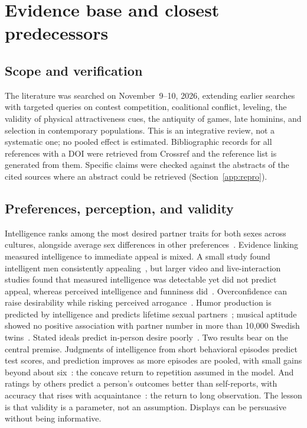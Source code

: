 \section{Evidence base and closest predecessors}\label{sec:evidence}

\subsection{Scope and verification}

\noindent The literature was searched on November~9--10, 2026, extending earlier searches with targeted queries on contest
competition, coalitional conflict, leveling, the validity of physical attractiveness cues, the antiquity of games, late
hominins, and selection in contemporary populations. This is an integrative review, not a systematic one; no pooled effect is
estimated. Bibliographic records for all \RefResolved{} references with a DOI were retrieved from Crossref and the reference
list is generated from them. Specific claims were checked against the abstracts of the cited sources where an abstract could
be retrieved (Section~\ref{app:repro}).

\subsection{Preferences, perception, and validity}

Intelligence ranks among the most desired partner traits for both sexes across cultures, alongside average sex differences in
other preferences~\cite{buss1989,walter2020}. Evidence linking measured intelligence to immediate appeal is mixed. A small study
found intelligent men consistently appealing~\cite{prokosch2009}, but larger video and live-interaction studies found that
measured intelligence was detectable yet did not predict appeal, whereas perceived intelligence and funniness
did~\cite{driebe2021}. Overconfidence can raise desirability while risking perceived arrogance~\cite{murphy2015}. Humor
production is predicted by intelligence and predicts lifetime sexual partners~\cite{greengross2011}; musical aptitude showed no
positive association with partner number in more than 10,000 Swedish twins~\cite{mosing2015}. Stated ideals predict
in-person desire poorly~\cite{eastwick2008}. Two results bear on the central premise. Judgments of intelligence from short
behavioral episodes predict test scores, and prediction improves as more episodes are pooled, with small gains beyond about
six~\cite{borkenau2004}: the concave return to repetition assumed in the model. And ratings by others predict a person's
outcomes better than self-reports, with accuracy that rises with acquaintance~\cite{connelly2010}: the return to long
observation. The lesson is
that validity is a parameter, not an assumption. Displays can be persuasive without being informative.

